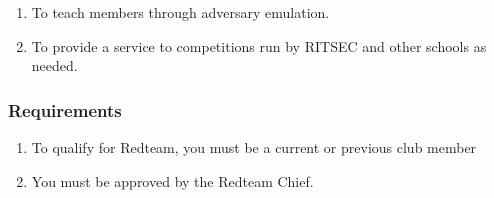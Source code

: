 \documentclass{article}
\begin{document}
\begin{enumerate}
  \item To teach members through adversary emulation.
  \item To provide a service to competitions run by RITSEC and other schools as
    needed.
\end{enumerate}

\subsubsection{Requirements}

\begin{enumerate}
  \item To qualify for Redteam, you must be a current or previous club member
  \item You must be approved by the Redteam Chief.
\end{enumerate}
\end{document}
